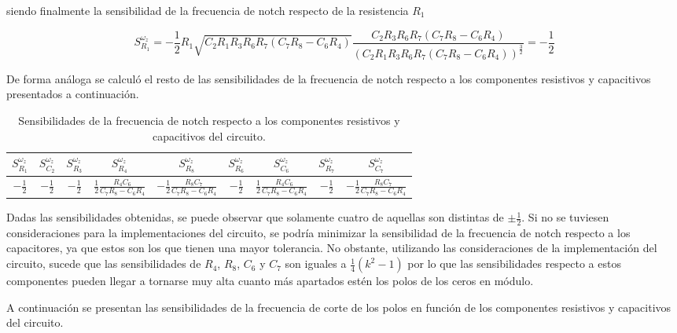 siendo finalmente la sensibilidad de la frecuencia de notch respecto de la resistencia $R_1$

\begin{equation}
S^{\omega_z}_{R_1} = - \frac{1}{2}  R_1 \sqrt{C_2 R_1 R_3 R_6 R_7 (C_7 R_8 - C_6 R_4)} \frac{C_2 R_3 R_6 R_7 (C_7 R_8 - C_6 R_4)}{(C_2 R_1 R_3 R_6 R_7 (C_7 R_8 - C_6 R_4))^{\frac{3}{2}}} = -\frac{1}{2}
\end{equation}

De forma análoga se calculó el resto de las sensibilidades de la frecuencia de notch respecto a los componentes resistivos y capacitivos presentados a continuación.

\begin{table}[H]
\centering
\begin{tabular}{@{}ccccccccc@{}}
\toprule
$S^{\omega_z}_{R_1}$ & $S^{\omega_z}_{C_2}$ & $S^{\omega_z}_{R_3}$ & $S^{\omega_z}_{R_4}$ & $S^{\omega_z}_{R_8}$ & $S^{\omega_z}_{R_6}$ & $S^{\omega_z}_{C_6}$ & $S^{\omega_z}_{R_7}$ & $S^{\omega_z}_{C_7}$  \\ \midrule
$-\frac{1}{2}$ & $-\frac{1}{2}$ & $-\frac{1}{2}$ & $\frac{1}{2}\frac{R_4 C_6}{C_7 R_8 - C_6 R_4}$ & $-\frac{1}{2}\frac{R_8 C_7}{C_7 R_8 - C_6 R_4}$ & $-\frac{1}{2}$ & $\frac{1}{2}\frac{R_4 C_6}{C_7 R_8 - C_6 R_4}$ & $-\frac{1}{2}$ & $-\frac{1}{2} \frac{R_8 C_7}{C_7 R_8 - C_6 R_4}$ \\ \bottomrule
\end{tabular}
\caption{Sensibilidades de la frecuencia de notch respecto a los componentes resistivos y capacitivos del circuito.}
\label{tab:sens_wz}
\end{table}

Dadas las sensibilidades obtenidas, se puede observar que solamente cuatro de aquellas son distintas de $\pm \frac{1}{2}$. Si no se tuviesen consideraciones para la implementaciones del circuito, se podría minimizar la sensibilidad de la frecuencia de notch respecto a los capacitores, ya que estos son los que tienen una mayor tolerancia. No obstante, utilizando las consideraciones de la implementación del circuito, sucede que las sensibilidades de $R_4$, $R_8$, $C_6$ y $C_7$ son iguales a $\frac{1}{4}(k^2-1)$ por lo que las sensibilidades respecto a estos componentes pueden llegar a tornarse muy alta cuanto más apartados estén los polos de los ceros en módulo. 

A continuación se presentan las sensibilidades de la frecuencia de corte de los polos en función de los componentes resistivos y capacitivos del circuito.

